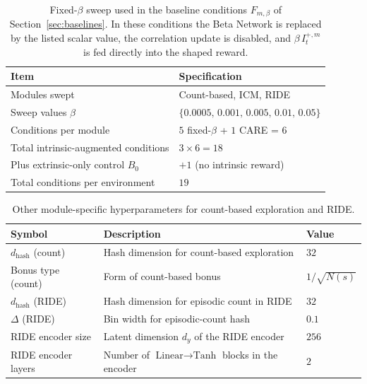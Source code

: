 \begin{table}[H]
\centering
\caption[Fixed-$\beta$ sweep.]{Fixed-$\beta$ sweep used in the baseline conditions $F_{m,\beta}$ of Section~\ref{sec:baselines}. In these conditions the Beta Network is replaced by the listed scalar value, the correlation update is disabled, and $\beta\,I_t^{+,m}$ is fed directly into the shaped reward.}
\label{tab:fixed_beta_sweep}
\begin{tabular}{|l|l|}
\hline
\textbf{Item} & \textbf{Specification} \\
\hline
Modules swept & Count-based, ICM, RIDE \\
\hline
Sweep values $\beta$ & $\{0.0005,\, 0.001,\, 0.005,\, 0.01,\, 0.05\}$ \\
\hline
Conditions per module & $5$ fixed-$\beta$ + $1$ CARE = $6$ \\
\hline
Total intrinsic-augmented conditions & $3 \times 6 = 18$ \\
\hline
Plus extrinsic-only control $B_0$ & $+1$ (no intrinsic reward) \\
\hline
Total conditions per environment & $19$ \\
\hline
\end{tabular}
\end{table}

\begin{table}[H]
\centering
\caption[Other module-specific hyperparameters.]{Other module-specific hyperparameters for count-based exploration and RIDE.}
\label{tab:other_hparams}
\begin{tabular}{|l|l|l|}
\hline
\textbf{Symbol} & \textbf{Description} & \textbf{Value} \\
\hline
$d_\text{hash}$ (count) & Hash dimension for count-based exploration & $32$ \\
\hline
Bonus type (count) & Form of count-based bonus & $1/\sqrt{N(s)}$ \\
\hline
$d_\text{hash}$ (RIDE) & Hash dimension for episodic count in RIDE & $32$ \\
\hline
$\Delta$ (RIDE) & Bin width for episodic-count hash & $0.1$ \\
\hline
RIDE encoder size & Latent dimension $d_y$ of the RIDE encoder & $256$ \\
\hline
RIDE encoder layers & Number of $\text{Linear} \to \text{Tanh}$ blocks in the encoder & $2$ \\
\hline
\end{tabular}
\end{table}

